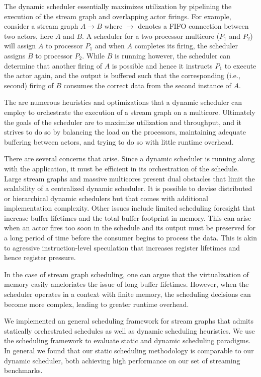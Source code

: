 The dynamic scheduler essentially maximizes utilization by pipelining
the execution of the stream graph and overlapping actor firings. For
example, consider a stream graph $A\rightarrow B$ where $\rightarrow$
denotes a FIFO connection between two actors, here $A$ and $B$. A
scheduler for a two processor multicore ($P_1$ and $P_2$) will assign
$A$ to processor $P_1$ and when $A$ completes its firing, the
scheduler assigns $B$ to processor $P_2$. While $B$ is running
however, the scheduler can determine that another firing of $A$ is
possible and hence it instructs $P_1$ to execute the actor again, and
the output is buffered such that the corresponding (i.e., second)
firing of $B$ consumes the correct data from the second instance of
$A$.


The are numerous heuristics and optimizations that a dynamic scheduler
can employ to orchestrate the execution of a stream graph on a
multicore. Ultimately the goals of the scheduler are to maximize
utilization and throughput, and it strives to do so by balancing the
load on the processors, maintaining adequate buffering between actors,
and trying to do so with little runtime overhead.

There are several concerns that arise. Since a dynamic scheduler is
running along with the application, it must be efficient in its
orchestration of the schedule. Large stream graphs and massive
multicores present dual obstacles that limit the scalability of a
centralized dynamic scheduler. It is possible to devise distributed or
hierarchical dynamic schedulers but that comes with additional
implementation complexity. Other issues include limited scheduling
foresight that increase buffer lifetimes and the total buffer
footprint in memory. This can arise when an actor fires too soon in
the schedule and its output must be preserved for a long period of
time before the consumer begins to process the data. This is akin to
agressive instruction-level speculation that increases register
lifetimes and hence register pressure.

In the case of stream graph scheduling, one can argue that the
virtualization of memory easily ameloriates the issue of long buffer
lifetimes. However, when the scheduler operates in a context with
finite memory, the scheduling decisions can become more complex,
leading to greater runtime overhead.

We implemented an general scheduling framework for stream graphs that
admits statically orchestrated schedules as well as dynamic scheduling
heuristics. We use the scheduling framework to evaluate static and
dynamic scheduling paradigms. In general we found that our static
scheduling methodology is comparable to our dynamic scheduler, both
achieving high performance on our set of streaming benchmarks.
